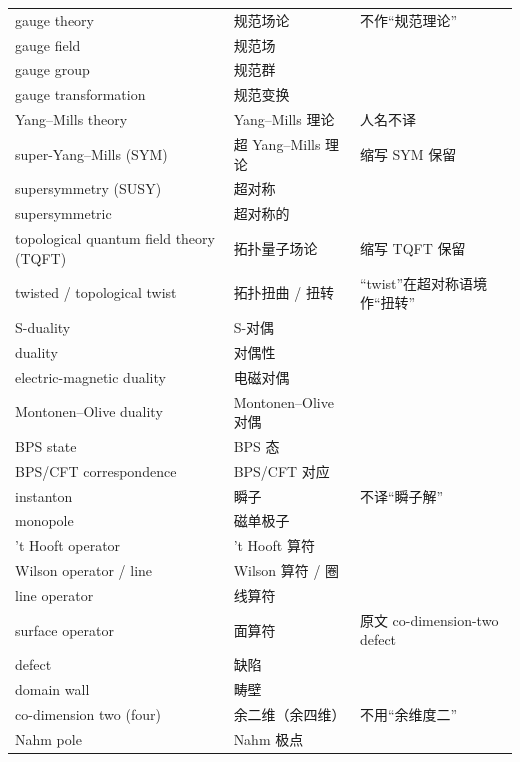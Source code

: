 \begin{longtable}{@{}p{}p{}p{}@{}}
gauge theory                & 规范场论            & 不作“规范理论” \\
gauge field                 & 规范场              & \\
gauge group                 & 规范群              & \\
gauge transformation        & 规范变换            & \\
Yang--Mills theory          & Yang--Mills 理论    & 人名不译 \\
super-Yang--Mills (SYM)     & 超 Yang--Mills 理论 & 缩写 SYM 保留 \\
supersymmetry (SUSY)        & 超对称              & \\
supersymmetric              & 超对称的            & \\
topological quantum field theory (TQFT) & 拓扑量子场论 & 缩写 TQFT 保留 \\
twisted / topological twist & 拓扑扭曲 / 扭转     & “twist”在超对称语境作“扭转” \\
S-duality                   & S-对偶              & \\
duality                     & 对偶性              & \\
electric-magnetic duality   & 电磁对偶            & \\
Montonen--Olive duality     & Montonen--Olive 对偶 & \\
BPS state                   & BPS 态              & \\
BPS/CFT correspondence      & BPS/CFT 对应        & \\
instanton                   & 瞬子                & 不译“瞬子解” \\
monopole                    & 磁单极子            & \\
't Hooft operator           & 't Hooft 算符       & \\
Wilson operator / line      & Wilson 算符 / 圈   & \\
line operator               & 线算符              & \\
surface operator            & 面算符              & 原文 co-dimension-two defect \\
defect                      & 缺陷                & \\
domain wall                 & 畴壁                & \\
co-dimension two (four)     & 余二维（余四维）    & 不用“余维度二” \\
Nahm pole                   & Nahm 极点           & \\

\end{longtable}
